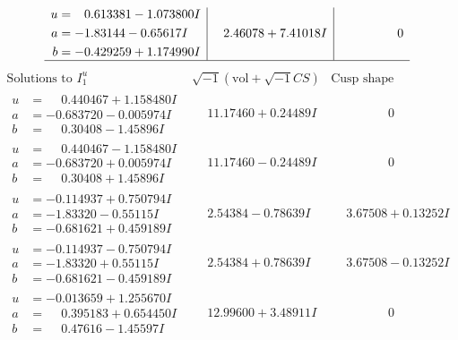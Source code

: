 \documentclass[1p]{elsarticle_modified}
\theoremstyle{definition}
\newcommand{\I}{\sqrt{-1}}
\begin{document}
$$\begin{array}{c|c|c}
\begin{aligned}
u &= \phantom{-}0.613381 - 1.073800 I \\
a &= -1.83144 - 0.65617 I \\
b &= -0.429259 + 1.174990 I\end{aligned}
 & \phantom{-}2.46078 + 7.41018 I & \phantom{-0.000000 } 0\\
 \hline 
 \end{array}$$\newpage$$\begin{array}{c|c|c}  
\text{Solutions to }I^u_{1}& \I (\text{vol} + \sqrt{-1}CS) & \text{Cusp shape}\\
 \hline 
\begin{aligned}
u &= \phantom{-}0.440467 + 1.158480 I \\
a &= -0.683720 - 0.005974 I \\
b &= \phantom{-}0.30408 - 1.45896 I\end{aligned}
 & \phantom{-}11.17460 + 0.24489 I & \phantom{-0.000000 } 0 \\ \hline\begin{aligned}
u &= \phantom{-}0.440467 - 1.158480 I \\
a &= -0.683720 + 0.005974 I \\
b &= \phantom{-}0.30408 + 1.45896 I\end{aligned}
 & \phantom{-}11.17460 - 0.24489 I & \phantom{-0.000000 } 0 \\ \hline\begin{aligned}
u &= -0.114937 + 0.750794 I \\
a &= -1.83320 - 0.55115 I \\
b &= -0.681621 + 0.459189 I\end{aligned}
 & \phantom{-}2.54384 - 0.78639 I & \phantom{-}3.67508 + 0.13252 I \\ \hline\begin{aligned}
u &= -0.114937 - 0.750794 I \\
a &= -1.83320 + 0.55115 I \\
b &= -0.681621 - 0.459189 I\end{aligned}
 & \phantom{-}2.54384 + 0.78639 I & \phantom{-}3.67508 - 0.13252 I \\ \hline\begin{aligned}
u &= -0.013659 + 1.255670 I \\
a &= \phantom{-}0.395183 + 0.654450 I \\
b &= \phantom{-}0.47616 - 1.45597 I\end{aligned}
 & \phantom{-}12.99600 + 3.48911 I & \phantom{-0.000000 } 0 \\ \hline\begin{aligned}

\end{aligned}
\end{array}$$
\end{document}
